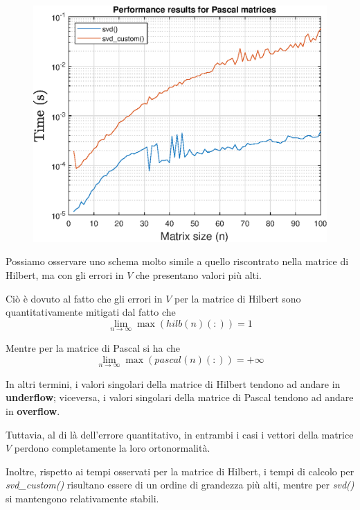 \begin{figure}[!htb]
\includegraphics[width=\linewidth]{imgs/09_-_Performance_results_for_Pascal_matrices.eps}
\endminipage
\end{figure}

Possiamo osservare uno schema molto simile a quello riscontrato nella matrice di 
Hilbert, ma con gli errori in $V$ che presentano valori più alti.

Ciò è dovuto al fatto che gli errori in $V$ per la matrice di Hilbert sono 
quantitativamente mitigati dal fatto che
\begin{equation*}
	\lim_{n \to \infty} \max(hilb(n)(:)) = 1
\end{equation*}

Mentre per la matrice di Pascal si ha che
\begin{equation*}
	\lim_{n \to \infty} \max(pascal(n)(:)) = +\infty
\end{equation*}

In altri termini, i valori singolari della matrice di Hilbert tendono ad andare 
in \textbf{underflow}; viceversa, i valori singolari della matrice di Pascal 
tendono ad andare in \textbf{overflow}.


Tuttavia, al di là dell'errore quantitativo, in entrambi i casi i vettori della 
matrice $V$ perdono completamente la loro ortonormalità.

Inoltre, rispetto ai tempi osservati per la matrice di Hilbert, i tempi di 
calcolo per \textit{svd\_custom()} risultano essere di un ordine di grandezza 
più alti, mentre per \textit{svd()} si mantengono relativamente stabili.


